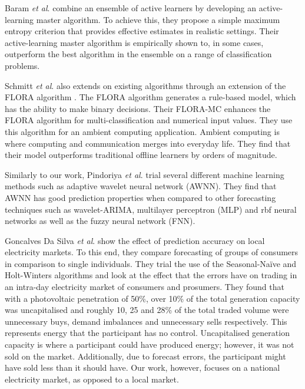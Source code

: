 Baram \textit{et al}. \cite{Baram2003} combine an ensemble of active learners by developing an active-learning master algorithm. To achieve this, they propose a simple maximum entropy criterion that provides effective estimates in realistic settings. Their active-learning master algorithm is empirically shown to, in some cases, outperform the best algorithm in the ensemble on a range of classification problems.

Schmitt \textit{et al}.\cite{Schmitt2008} also extends on existing algorithms through an extension of the FLORA algorithm \cite{Widmer1996}. The FLORA algorithm generates a rule-based model, which has the ability to make binary decisions. Their FLORA-MC enhances the FLORA algorithm for multi-classification and numerical input values. They use this algorithm for an ambient computing application. Ambient computing is where computing and communication merges into everyday life. They find that their model outperforms traditional offline learners by orders of magnitude.

Similarly to our work, Pindoriya \textit{et al}. \cite{Pindoriya2008} trial several different machine learning methods such as adaptive wavelet neural network (AWNN). They find that AWNN has good prediction properties when compared to other forecasting techniques such as wavelet-ARIMA, multilayer perceptron (MLP) and \acrfull{rbf} neural networks as well as the fuzzy neural network (FNN).


Goncalves Da Silva \textit{et al}. \cite{GoncalvesDaSilva2014} show the effect of prediction accuracy on local electricity markets. To this end, they compare forecasting of groups of consumers in comparison to single individuals. They trial the use of the Seasonal-Naïve and Holt-Winters algorithms and look at the effect that the errors have on trading in an intra-day electricity market of consumers and prosumers. They found that with a photovoltaic penetration of 50\%, over 10\% of the total generation capacity was uncapitalised and roughly 10, 25 and 28\% of the total traded volume were unnecessary buys, demand imbalances and unnecessary sells respectively. This represents energy that the participant has no control. Uncapitalised generation capacity is where a participant could have produced energy; however, it was not sold on the market. Additionally, due to forecast errors, the participant might have sold less than it should have. Our work, however, focuses on a national electricity market, as opposed to a local market.




